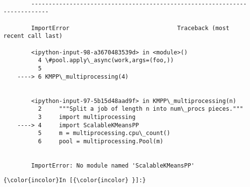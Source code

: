 \documentclass{article}
\begin{document}
    \begin{Verbatim}[commandchars=\\\{\}]

        ---------------------------------------------------------------------------

        ImportError                               Traceback (most recent call last)

        <ipython-input-98-a3670483539d> in <module>()
          4 \#pool.apply\_async(work,args=(foo,))
          5 
    ----> 6 KMPP\_multiprocessing(4)
    

        <ipython-input-97-5b15d48aad9f> in KMPP\_multiprocessing(n)
          2     """Split a job of length n into num\_procs pieces."""
          3     import multiprocessing
    ----> 4     import ScalableKMeansPP
          5     m = multiprocessing.cpu\_count()
          6     pool = multiprocessing.Pool(m)


        ImportError: No module named 'ScalableKMeansPP'

    \end{Verbatim}

    \begin{Verbatim}[commandchars=\\\{\}]
{\color{incolor}In [{\color{incolor} }]:} 
\end{Verbatim}


    
    
    
    
\end{document}
